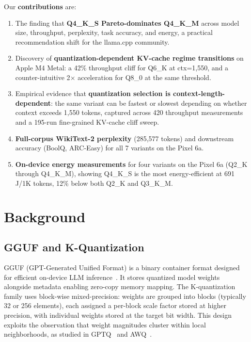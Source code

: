 \documentclass{article}
\begin{document}
Our \textbf{contributions} are:
\begin{enumerate}
  \item The finding that \textbf{Q4\_K\_S Pareto-dominates Q4\_K\_M} across model size, throughput, perplexity, task accuracy, and energy, a practical recommendation shift for the llama.cpp community.
  \item Discovery of \textbf{quantization-dependent KV-cache regime transitions} on Apple M4 Metal: a 42\% throughput cliff for Q6\_K at ctx=1,550, and a counter-intuitive 2$\times$ acceleration for Q8\_0 at the same threshold.
  \item Empirical evidence that \textbf{quantization selection is context-length-dependent}: the same variant can be fastest or slowest depending on whether context exceeds 1,550 tokens, captured across 420 throughput measurements and a 195-run fine-grained KV-cache cliff sweep.
  \item \textbf{Full-corpus WikiText-2 perplexity} (285,577 tokens) and downstream accuracy (BoolQ, ARC-Easy) for all 7 variants on the Pixel 6a.
  \item \textbf{On-device energy measurements} for four variants on the Pixel 6a (Q2\_K through Q4\_K\_M), showing Q4\_K\_S is the most energy-efficient at 691\,J/1K tokens, 12\% below both Q2\_K and Q3\_K\_M.
\end{enumerate}

\section{Background}
\label{sec:background}

\subsection{GGUF and K-Quantization}

GGUF (GPT-Generated Unified Format) is a binary container format designed for efficient on-device LLM inference~\cite{llamacpp}. It stores quantized model weights alongside metadata enabling zero-copy memory mapping. The K-quantization family uses block-wise mixed-precision: weights are grouped into blocks (typically 32 or 256 elements), each assigned a per-block scale factor stored at higher precision, with individual weights stored at the target bit width. This design exploits the observation that weight magnitudes cluster within local neighborhoods, as studied in GPTQ~\cite{gptq} and AWQ~\cite{awq}.
\end{document}
